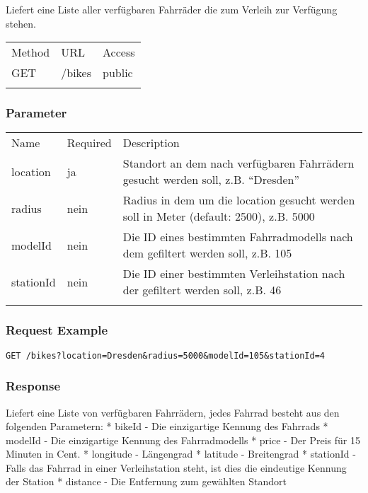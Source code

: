 Liefert eine Liste aller verfügbaren Fahrräder die zum Verleih zur
Verfügung stehen.

\begin{longtable}[c]{@{}lll@{}}
\toprule\addlinespace
Method & URL & Access
\\\addlinespace
\midrule\endhead
GET & /bikes & public
\\\addlinespace
\bottomrule
\end{longtable}

\subsubsection{Parameter}\label{parameter}

\begin{longtable}[c]{@{}lll@{}}
\toprule\addlinespace
Name & Required & Description
\\\addlinespace
\midrule\endhead
location & ja & Standort an dem nach verfügbaren Fahrrädern gesucht werden soll, z.B. ``Dresden''
\\\addlinespace
radius & nein & Radius in dem um die location gesucht werden soll in Meter (default: 2500), z.B. 5000
\\\addlinespace
modelId & nein & Die ID eines bestimmten Fahrradmodells nach dem gefiltert werden soll, z.B. 105
\\\addlinespace
stationId & nein & Die ID einer bestimmten Verleihstation nach der gefiltert werden soll, z.B. 46
\\\addlinespace
\bottomrule
\end{longtable}

\subsubsection{Request Example}\label{request-example}

\begin{verbatim}
GET /bikes?location=Dresden&radius=5000&modelId=105&stationId=4
\end{verbatim}

\subsubsection{Response}\label{response}

Liefert eine Liste von verfügbaren Fahrrädern, jedes Fahrrad besteht aus
den folgenden Parametern: * bikeId - Die einzigartige Kennung des
Fahrrads * modelId - Die einzigartige Kennung des Fahrradmodells * price
- Der Preis für 15 Minuten in Cent. * longitude - Längengrad * latitude
- Breitengrad * stationId - Falls das Fahrrad in einer Verleihstation
steht, ist dies die eindeutige Kennung der Station * distance - Die
Entfernung zum gewählten Standort

